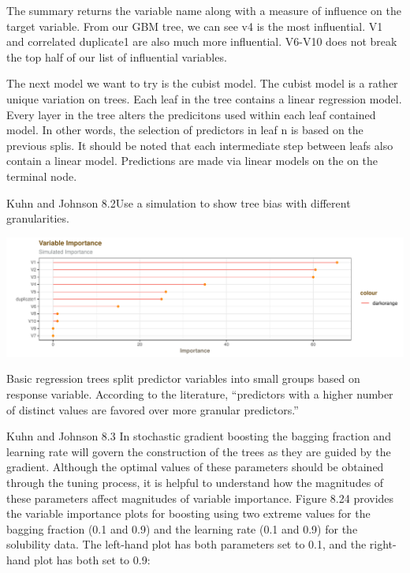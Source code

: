 \documentclass[]{report}
\begin{document}
The summary returns the variable name along with a measure of influence
on the target variable. From our GBM tree, we can see v4 is the most
influential. V1 and correlated duplicate1 are also much more
influential. V6-V10 does not break the top half of our list of
influential variables.

The next model we want to try is the cubist model. The cubist model is a
rather unique variation on trees. Each leaf in the tree contains a
linear regression model. Every layer in the tree alters the predicitons
used within each leaf contained model. In other words, the selection of
predictors in leaf n is based on the previous splis. It should be noted
that each intermediate step between leafs also contain a linear model.
Predictions are made via linear models on the on the terminal node.


\begin{question}{Kuhn and Johnson 8.2}Use a simulation to show tree bias with different granularities.\end{question}

\includegraphics{Homework-Two_files/figure-latex/kj-8.2-1.pdf}

Basic regression trees split predictor variables into small groups based
on response variable. According to the literature, ``predictors with a
higher number of distinct values are favored over more granular
predictors.''


\begin{question}{Kuhn and Johnson 8.3} In stochastic gradient boosting the bagging fraction and learning rate will govern the construction of the trees as they are guided by the gradient. Although the optimal values of these parameters should be obtained through the tuning process, it is helpful to understand how the magnitudes of these parameters affect magnitudes of variable importance. Figure 8.24 provides the variable importance plots for boosting using two extreme values for the bagging fraction (0.1 and 0.9) and the learning rate (0.1 and 0.9) for the solubility data. The left-hand plot has both parameters set to 0.1, and the right-hand plot has both set to 0.9: \end{question}
\end{document}
